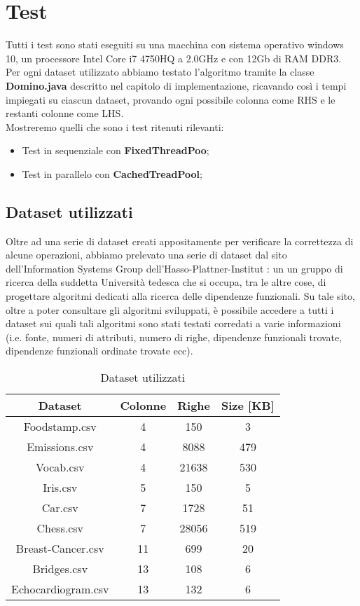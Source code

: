 \section{Test}
Tutti i test sono stati eseguiti su una macchina con sistema operativo windows 10, un processore Intel Core i7 4750HQ a 2.0GHz e con 12Gb di RAM DDR3.\\
Per ogni dataset utilizzato abbiamo testato l'algoritmo tramite la classe \textbf{Domino.java} descritto nel capitolo di implementazione, ricavando così i tempi impiegati su ciascun dataset, provando ogni possibile colonna come RHS e le restanti colonne come LHS.  \\

Mostreremo quelli che sono i test ritenuti rilevanti:
\begin{itemize}
	\item Test in sequenziale con \textbf{FixedThreadPoo};
	\item Test in parallelo con \textbf{CachedTreadPool};
\end{itemize}
\subsection{Dataset utilizzati}
Oltre ad una serie di dataset creati appositamente per verificare la correttezza di alcune operazioni, abbiamo prelevato una serie di dataset dal sito dell'Information Systems Group dell'Hasso-Plattner-Institut \cite{metanome}: un un gruppo di ricerca della suddetta Università tedesca che si occupa, tra le altre cose, di progettare algoritmi dedicati alla ricerca delle dipendenze funzionali. Su tale sito, oltre a poter consultare gli algoritmi sviluppati, è possibile accedere a tutti i dataset sui quali tali algoritmi sono stati testati corredati a varie informazioni (i.e. fonte, numeri di attributi, numero di righe, dipendenze funzionali trovate, dipendenze funzionali ordinate trovate ecc).\\
\begin{table}[H]
	\centering
	\begin{tabular}{|c|c|c|c|}
		\hline 
		\textbf{Dataset} & \textbf{Colonne} & \textbf{Righe}  & \textbf{Size [KB]} \\ 
		\hline 
		Foodstamp.csv & 4  & 150 & 3 \\ 
		\hline 
		Emissions.csv& 4 & 8088 &479  \\ 
		\hline 
		Vocab.csv& 4 & 21638 &530  \\ 
		\hline 
		Iris.csv& 5 &  150&5  \\ 
		\hline 
		Car.csv&7  &  1728&51  \\ 
		\hline 
		Chess.csv&7  &28056  &519  \\ 
		\hline 
		Breast-Cancer.csv& 11 & 699  & 20  \\ 
		\hline 
		Bridges.csv& 13 & 108 &  6\\ 
		\hline 
		Echocardiogram.csv& 13 & 132 & 6 \\ 
		\hline 
	\end{tabular}
	\caption{Dataset utilizzati}
	\label{tab:Dataset utilizzati}
\end{table}

